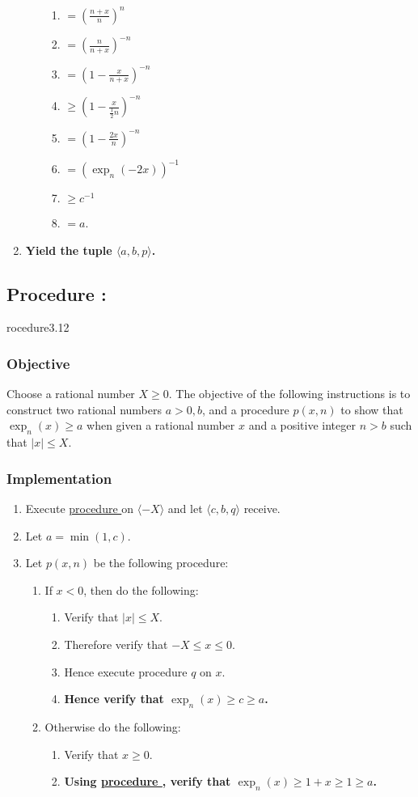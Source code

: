 \documentclass{article}
\newcounter{procedure}[part]
\newcommand{\procedure}[1]{\subsection*{Procedure \thepart:\theprocedure}\label{sec:procedure #1}\global\expandafter\edef\csname procedure#1\endcsname{\thepart:\theprocedure}\addtocounter{procedure}{1}}
\newcommand{\objective}{\subsubsection*{Objective}}
\newcommand{\implementation}{\subsubsection*{Implementation}}
\newcommand{\procedurehr}[1]{\hyperref[sec:procedure #1]{procedure \expandafter\csname procedure#1\endcsname}}
\begin{document}
\begin{multicols}{2}
\begin{enumerate}
\begin{enumerate}
						\begin{enumerate}
							\item $=(\frac{n+x}{n})^n$
							\item $=(\frac{n}{n+x})^{-n}$
							\item $=(1-\frac{x}{n+x})^{-n}$
							\item $\ge (1-\frac{x}{\frac{1}{2}n})^{-n}$
							\item $=(1-\frac{2x}{n})^{-n}$
							\item $=(\exp_n(-2x))^{-1}$
							\item $\ge c^{-1}$
							\item $=a$.
						\end{enumerate}
					\end{enumerate}
					\item \textbf{Yield the tuple $\langle a,b,p\rangle$.}
				\end{enumerate}
		\procedure{3.12}
			\objective
				Choose a rational number $X\ge 0$. The objective of the following instructions is to construct two rational numbers $a>0,b$, and a procedure $p(x,n)$ to show that $\exp_n(x)\ge a$ when given a rational number $x$ and a positive integer $n>b$ such that $\lvert x\rvert\le X$.
			\implementation
				\begin{enumerate}
					\item Execute \procedurehr{3.11} on $\langle -X\rangle$ and let $\langle c,b,q\rangle$ receive.
					\item Let $a=\min(1,c)$.
					\item Let $p(x,n)$ be the following procedure:
					\begin{enumerate}
						\item If $x<0$, then do the following:
						\begin{enumerate}
							\item Verify that $\lvert x\rvert\le X$.
							\item Therefore verify that $-X\le x\le 0$.
							\item Hence execute procedure $q$ on $x$.
							\item \textbf{Hence verify that $\exp_n(x)\ge c\ge a$.}
						\end{enumerate}
						\item Otherwise do the following:
						\begin{enumerate}
							\item Verify that $x\ge 0$.
							\item \textbf{Using \procedurehr{3.07}, verify that $\exp_n(x)\ge 1+x\ge 1\ge a$.}

\end{enumerate}
\end{enumerate}
\end{enumerate}
\end{multicols}
\end{document}
